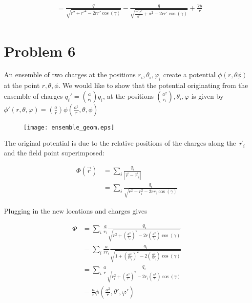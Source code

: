 \documentclass[paper=a4, fontsize=11pt]{scrartcl} %
\numberwithin{equation}{section} %
\numberwithin{figure}{section} %
\numberwithin{table}{section} %
\begin{document}
\begin{align}
&= \frac{q}{\sqrt{r^2 + r'^2 - 2rr'\cos(\gamma)}} - \frac{q}{\sqrt{\frac{r'^2r^2}{a^2} + a^2 - 2 r r'\cos(\gamma)}} + \frac{Va}{r} \\
\end{align}



\section{Problem 6}
An ensemble of two charges at the positions $r_i, \theta_i, \varphi_i$ create a potential $\phi(r, \theta \phi)$ at the point $r, \theta, \phi$. We would like to show that the potential originating from the ensemble of charges $q_i' = \left(\frac{a}{r_i}\right) q_i$, at the positions $\left(\frac{a^2}{r_i}\right), \theta_i, \varphi$ is given by $\phi'(r, \theta, \varphi) = \left(\frac{a}{r}\right)\phi\left(\frac{a^2}{r}, \theta, \phi\right)$

\begin{figure}[H]
\begin{center}
\texttt{[image: ensemble\_geom.eps]}
\end{center}
\end{figure}

The original potential is due to the relative positions of the charges along the $\vec{r}_i$ and the field point superimposed:

\begin{align}
\Phi(\vec{r}) &= \sum_i \frac{q_i}{|\vec{r} - \vec{r}_i|} \\
&= \sum_i \frac{q_i}{\sqrt{r^2 + r_i^2 - 2 r r_i \cos(\gamma)}}
\end{align}

Plugging in the new locations and charges gives

\begin{align}
\Phi &= \sum_i \frac{a}{r_i} \frac{q_i}{\sqrt{r^2 + \left(\frac{a^2}{r_i}\right)^2 - 2 r \left(\frac{a^2}{r_i}\right)\cos(\gamma)}} \\
&= \sum_i \frac{a}{rr_i}\frac{q_i}{\sqrt{1 + \left(\frac{a^2}{rr_i}\right)^2 - 2 \left(\frac{a^2}{rr_i}\right)\cos(\gamma)}} \\ 
&= \sum_i \frac{a}{r} \frac{q_i}{\sqrt{r_i^2 + \left(\frac{a^2}{r}\right)^2 - 2 r_i \left(\frac{a^2}{r}\right)\cos(\gamma)}}  \\
&= \frac{a}{r}\phi(\frac{a^2}{r}, \theta', \varphi')
\end{align}
\end{document}
